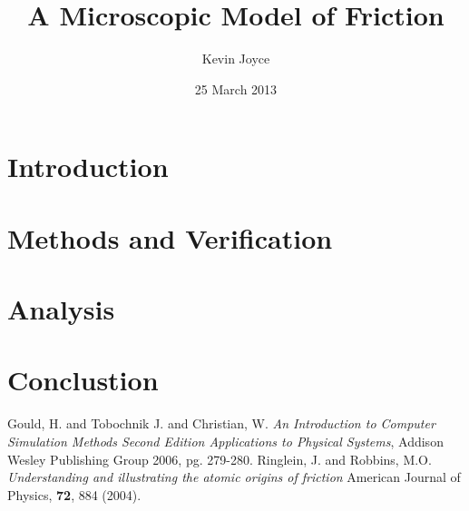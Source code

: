 \documentclass[12pt]{amsart}
\title{A Microscopic Model of Friction}
\author{Kevin Joyce}
\date{25 March 2013}
\begin{document}
\maketitle
\section{Introduction}
   
\section{Methods and Verification} 

\section{Analysis}

\section{Conclustion}

\begin{thebibliography}{[1]}
   Gould, H. and Tobochnik J. and Christian, W. \emph{An Introduction to Computer Simulation Methods Second Edition Applications to Physical Systems},  Addison Wesley Publishing Group 2006, pg. 279-280.
   Ringlein, J. and Robbins, M.O. \emph{Understanding and illustrating the atomic origins of friction}  American Journal of Physics, {\bf 72}, 884 (2004).
\end{thebibliography}
\end{document}
